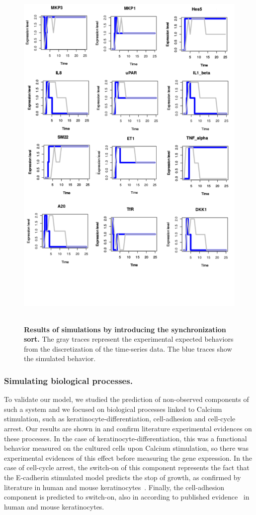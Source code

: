 \begin{figure}[H]
\centering
\includegraphics[width=5in,height=7in]{images/12genes_sim.png}
\caption{{\bf Results of simulations by introducing the synchronization sort.} The gray traces represent the experimental expected behaviors
from the discretization of the time-series data. The blue traces show the simulated behavior.}
\label{fig:rws}
\end{figure}



\subsubsection{Simulating biological processes.}
To validate our model, we studied the prediction of non-observed components of such a system and we focused on biological processes linked 
to Calcium stimulation, such as keratinocyte-differentiation, cell-adhesion and cell-cycle arrest.
Our results are shown in  and confirm literature experimental evidences on these processes.
In the case of keratinocyte-differentiation, this was a functional behavior measured on the cultured cells upon Calcium stimulation,
 so there was experimental evidences of this effect before measuring the gene expression.  
In the case of cell-cycle arrest, the switch-on of this component represents the fact that the E-cadherin stimulated model predicts the stop 
of growth, as confirmed by literature in human and mouse keratinocytes~\cite{Kolly2005}.
Finally, the cell-adhesion component is predicted to switch-on, also in according to published evidence~\cite{Tu2011} in human and mouse keratinocytes.

